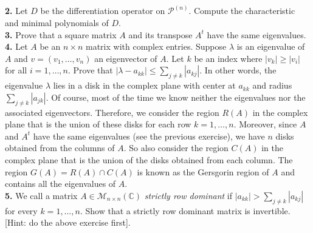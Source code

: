 \documentclass[11pt]{amsart}
\theoremstyle{definition}  %
\newcommand{\C}{\mathbb{C}}
\begin{document}
\vskip 0.1cm
\noindent 
{\bf 2.} Let $D$ be the differentiation operator on $\mathcal{P}^{(n)}$. Compute the characteristic and minimal polynomials of $D$. \\

\vskip 0.1cm
\noindent 
{\bf 3.}  Prove that a square matrix $A$ and its transpose $A^t$ have the same eigenvalues. \\

\vskip 0.1cm
\noindent
{\bf 4. } Let $A$ be an $n\times n$ matrix with complex entries. Suppose $\lambda$ is an eigenvalue of $A$ and $v = (v_1, \ldots, v_n)$ an eigenvector of $A$. Let $k$ be an index
where $|v_k| \geq |v_i|$ for all $i=1, \ldots, n$.  Prove that $|\lambda - a_{kk}| \leq \sum_{j \neq k} |a_{kj}|$. In other words, the eigenvalue $\lambda$ lies in a disk in the complex plane with 
center at $a_{kk}$ and radius $\sum_{j \neq k} |a_{jk}|$. Of course, most of the time we know neither the eigenvalues nor the associated eigenvectors. Therefore, we consider the
region $R(A)$ in the complex plane that is the union of these disks for each row $k=1, \ldots, n$. Moreover, since $A$ and $A^t$ have the same eigenvalues (see the previous exercise),
we have $n$ disks obtained from the columns of $A$. So also consider the region $C(A)$ in the complex plane that is the union of the disks obtained from each column. The region
$G(A) = R(A) \cap C(A)$ is known as the Gersgorin region of $A$ and contains all the eigenvalues of $A$. \\


\vskip 0.1cm
\noindent
{\bf 5.} We call a matrix $A \in \mathcal{M}_{n \times n}(\C)$ {\it strictly row dominant} if $|a_{kk}| > \sum_{j \neq k} |a_{kj}|$ for every $k =1, \ldots, n$. Show that a strictly
row dominant matrix is invertible. [Hint: do the above exercise first]. \\ 
\end{document}
